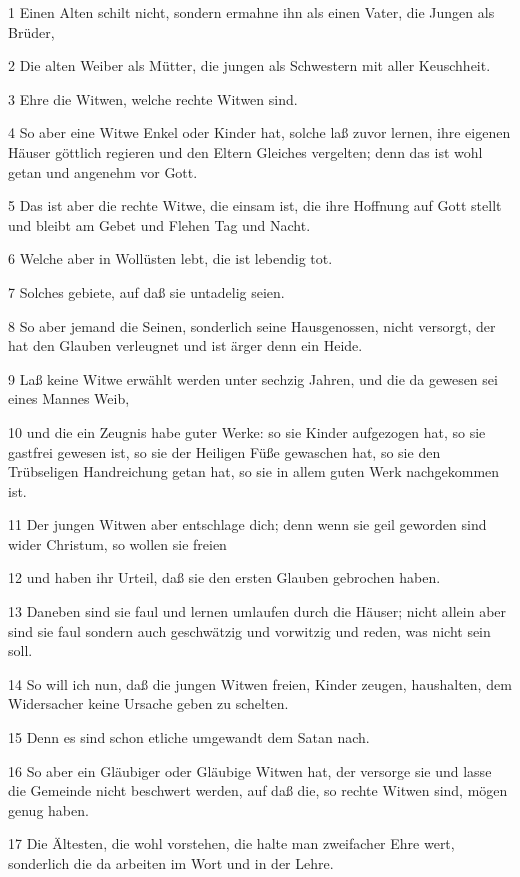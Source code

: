 \par 1 Einen Alten schilt nicht, sondern ermahne ihn als einen Vater, die Jungen als Brüder,
\par 2 Die alten Weiber als Mütter, die jungen als Schwestern mit aller Keuschheit.
\par 3 Ehre die Witwen, welche rechte Witwen sind.
\par 4 So aber eine Witwe Enkel oder Kinder hat, solche laß zuvor lernen, ihre eigenen Häuser göttlich regieren und den Eltern Gleiches vergelten; denn das ist wohl getan und angenehm vor Gott.
\par 5 Das ist aber die rechte Witwe, die einsam ist, die ihre Hoffnung auf Gott stellt und bleibt am Gebet und Flehen Tag und Nacht.
\par 6 Welche aber in Wollüsten lebt, die ist lebendig tot.
\par 7 Solches gebiete, auf daß sie untadelig seien.
\par 8 So aber jemand die Seinen, sonderlich seine Hausgenossen, nicht versorgt, der hat den Glauben verleugnet und ist ärger denn ein Heide.
\par 9 Laß keine Witwe erwählt werden unter sechzig Jahren, und die da gewesen sei eines Mannes Weib,
\par 10 und die ein Zeugnis habe guter Werke: so sie Kinder aufgezogen hat, so sie gastfrei gewesen ist, so sie der Heiligen Füße gewaschen hat, so sie den Trübseligen Handreichung getan hat, so sie in allem guten Werk nachgekommen ist.
\par 11 Der jungen Witwen aber entschlage dich; denn wenn sie geil geworden sind wider Christum, so wollen sie freien
\par 12 und haben ihr Urteil, daß sie den ersten Glauben gebrochen haben.
\par 13 Daneben sind sie faul und lernen umlaufen durch die Häuser; nicht allein aber sind sie faul sondern auch geschwätzig und vorwitzig und reden, was nicht sein soll.
\par 14 So will ich nun, daß die jungen Witwen freien, Kinder zeugen, haushalten, dem Widersacher keine Ursache geben zu schelten.
\par 15 Denn es sind schon etliche umgewandt dem Satan nach.
\par 16 So aber ein Gläubiger oder Gläubige Witwen hat, der versorge sie und lasse die Gemeinde nicht beschwert werden, auf daß die, so rechte Witwen sind, mögen genug haben.
\par 17 Die Ältesten, die wohl vorstehen, die halte man zweifacher Ehre wert, sonderlich die da arbeiten im Wort und in der Lehre.
